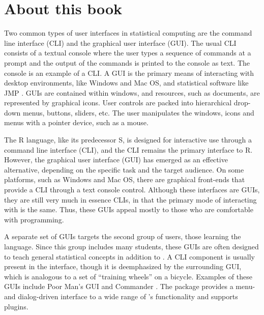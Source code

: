 


\section*{About this book}
\label{sec:about}

Two common types of user interfaces in statistical computing are the
command line interface (CLI) and the graphical user interface
(GUI). The usual CLI consists of a textual console where the user
types a sequence of commands at a prompt and the output of the
commands is printed to the console as text. The  console
is an example of a CLI. A GUI is the primary means of interacting with
desktop environments, like Windows and Mac OS, and statistical
software like JMP \citep{JMP}. GUIs are contained within windows, and
resources, such as documents, are represented by graphical icons.
User controls are packed into hierarchical drop-down menus, buttons,
sliders, etc. The user manipulates the windows, icons and menus with a
pointer device, such as a mouse.

The R language, like its predecessor S, is designed for interactive
use through a command line interface (CLI), and the CLI remains the
primary interface to R. However, the graphical user interface (GUI)
has emerged as an effective alternative, depending on the specific
task and the target audience.  On some platforms, such as Windows and
Mac OS, there are graphical front-ends that provide a CLI through a
text console control. Although these interfaces are GUIs, they are
still very much in essence CLIs, in that the primary mode of
interacting with  is the same. Thus, these GUIs appeal
mostly to those who are comfortable with  programming.  

A separate set of GUIs targets the second group of users, those
learning the  language. Since this group includes many
students, these GUIs are often designed to teach general statistical
concepts in addition to .  A CLI component is usually
present in the interface, though it is deemphasized by the surrounding
GUI, which is analogous to a set of ``training wheels'' on a
bicycle. Examples of these GUIs include Poor Man's GUI
\citep[,][]{pmg} and  Commander \citep{rcmndr}.
The  package provides a menu- and dialog-driven interface
to a wide range of \R's functionality and supports plugins. 


